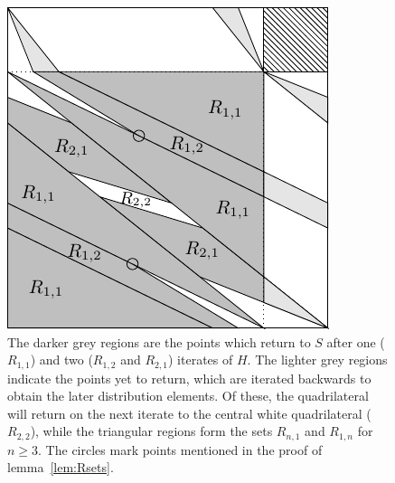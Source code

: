 \documentclass{iopart}
\begin{document}
%	

\begin{figure}
	\centering
\includegraphics{R12}
	\caption{The darker grey regions are the points which return to $S$ after one ($R_{1,1}$) and two ($R_{1,2}$ and $R_{2,1}$) iterates of $H$. The lighter grey regions indicate the points yet to return, which are iterated backwards to obtain the later distribution elements. Of these, the quadrilateral will return on the next iterate to the central white quadrilateral ($R_{2,2}$), while the triangular regions form the sets $R_{n,1}$ and 
$R_{1,n}$ for $n \ge 3$. The circles mark points mentioned in the proof of lemma~\ref{lem:Rsets}.}
	\label{fig:R12}
\end{figure}
\end{document}
